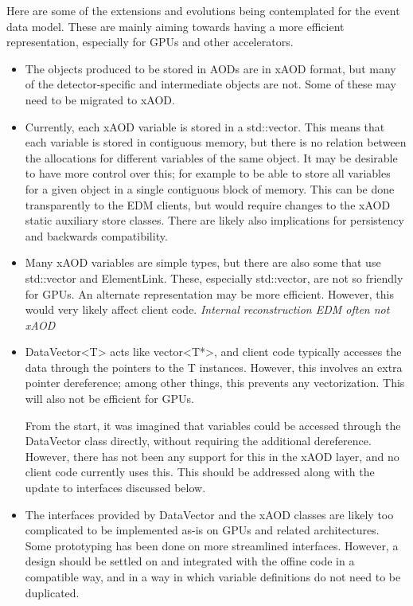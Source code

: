 
Here are some of the extensions and evolutions being contemplated
for the event data model.  These are mainly aiming towards having
a more efficient representation, especially for GPUs and other
accelerators.

\begin{itemize}
\item The objects produced to be stored in AODs are in xAOD format,
  but many of the detector-specific and intermediate objects
  are not.  Some of these may need to be migrated to xAOD.

\item Currently, each xAOD variable is stored in a std::vector.  This means
  that each variable is stored in contiguous memory, but there is no relation
  between the allocations for different variables of the same object.
  It may be desirable to have more control over this; for example to be able
  to store all variables for a given object in a single contiguous
  block of memory.  This can be done transparently to the EDM clients,
  but would require changes to the xAOD static auxiliary store classes.
  There are likely also implications for persistency and backwards
  compatibility.

\item Many xAOD variables are simple types, but there are also some that
  use std::vector and ElementLink.  These, especially std::vector, are not
  so friendly for GPUs.  An alternate representation may be more
  efficient.  However, this would very likely affect client code.
  {\it \color{blue} Internal reconstruction EDM often not xAOD}

\item DataVector<T> acts like vector<T*>, and client code typically accesses
  the data through the pointers to the T instances.  However, this involves
  an extra pointer dereference; among other things, this prevents any
  vectorization.  This will also not be efficient for GPUs.

  From the start, it was imagined that variables could be accessed
  through the DataVector class directly, without requiring the additional
  dereference.  However, there has not been any support for this in the
  xAOD layer, and no client code currently uses this.  This should be
  addressed along with the update to interfaces discussed below.

\item The interfaces provided by DataVector and the xAOD classes
  are likely too complicated to be implemented as-is on GPUs and
  related architectures.  Some prototyping has been done on more
  streamlined interfaces.  However, a design should be settled
  on and integrated with the offine code in a compatible way,
  and in a way in which variable definitions do not need to be duplicated.


\end{itemize}
